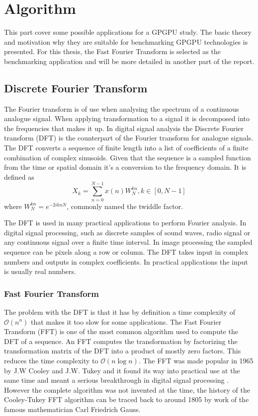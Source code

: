 \chapter{Algorithm}
This part cover some possible applications for a GPGPU study. The basic theory and motivation why they are suitable for benchmarking GPGPU technologies is presented. For this thesis, the Fast Fourier Transform is selected as the benchmarking application and will be more detailed in another part of the report.

\newtheorem{thm}{Theorem}[chapter] %
\theoremstyle{definition}
\newtheorem{defn}[thm]{Definition} 

\section{Discrete Fourier Transform}
The Fourier transform is of use when analysing the spectrum of a continuous analogue signal. When applying transformation to a signal it is decomposed into the frequencies that makes it up. In digital signal analysis the Discrete Fourier transform (DFT) is the counterpart of the Fourier transform for analogue signals. The DFT converts a sequence of finite length into a list of coefficients of a finite combination of complex sinusoids. Given that the sequence is a sampled function from the time or spatial domain it's a conversion to the frequency domain. It is defined as
\begin{equation}
	X_k=\sum_{n=0}^{N-1}x(n)W_N^{kn}, k \in {[0, N-1]}	
\end{equation}
where $W_N^{kn}=e^{-2iknN}$, commonly named the twiddle factor\cite{Gentleman1966}.

The DFT is used in many practical applications to perform Fourier analysis. In digital signal processing, such as discrete samples of sound waves, radio signal or any continuous signal over a finite time interval. In image processing the sampled sequence can be pixels along a row or column. The DFT takes input in complex numbers and outputs in complex coefficients. In practical applications the input is usually real numbers.

\subsection{Fast Fourier Transform}
The problem with the DFT is that it has by definition a time complexity of $\mathcal{O}(n^n)$ that makes it too slow for some applications. The Fast Fourier Transform (FFT) is one of the most common algorithm used to compute the DFT of a sequence. An FFT computes the transformation by factorizing the transformation matrix of the DFT into a product of mostly zero factors. This reduces the time complexity to $\mathcal{O}(n\log{}n)$.
The FFT was made popular in 1965 by J.W Cooley and J.W. Tukey and it found its way into practical use at the same time and meant a serious breakthrough in digital signal processing \cite{Cooley1969, Brigham1967}. However the complete algorithm was not invented at the time, the history of the Cooley-Tukey FFT algorithm can be traced back to around 1805 by work of the famous mathematician Carl Friedrich Gauss\cite{Heideman1985}.

